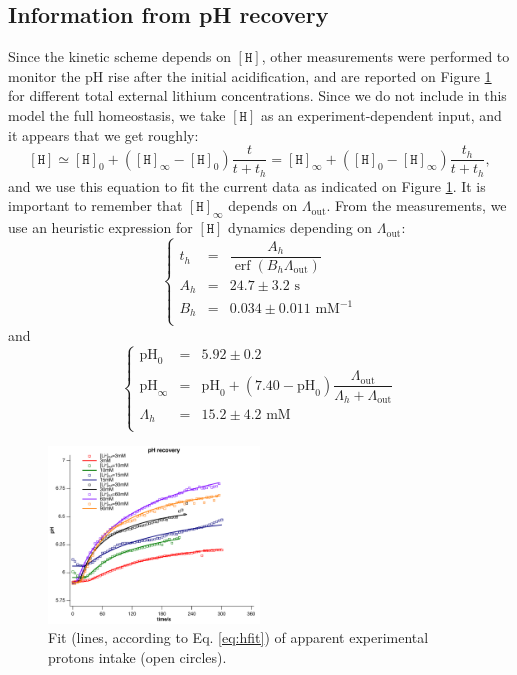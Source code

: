 \documentclass[aps,onecolumn,12pt]{revtex4}
\newcommand{\mychem}[1]{\mathtt{#1}}
\newcommand{\myconc}[1]{\left\lbrack{#1}\right\rbrack}
\newcommand{\spproton}{\mychem{H}}
\newcommand{\proton}{\myconc{\spproton}}
\newcommand{\LiAll}{\Lambda}
\newcommand{\LiAllOut}{{\LiAll}_{\mathrm{out}}}
\DeclareMathOperator\erf{erf}
\newcommand{\pH}{\ensuremath{\mathrm{pH}}}
\begin{document}
\subsection{Information from pH recovery}
Since the kinetic scheme depends on $\proton$, other measurements were performed to monitor the pH rise after the initial acidification, 
and are reported on Figure \ref{fig:protons} for different total external lithium concentrations. Since we do not include in this model the full homeostasis,
we take $\proton$ as an experiment-dependent input, and it appears that we get roughly:
\begin{equation}
\label{eq:hfit}
	\proton \simeq \proton_0 + \left(\proton_\infty-\proton_0\right) \dfrac{t}{t+t_h} = \proton_\infty + \left(\proton_0 - \proton_\infty\right) \dfrac{t_h}{t+t_h},
\end{equation}
and we use this equation to fit the current data as indicated on Figure \ref{fig:protons}. It is important to remember that $\proton_\infty$ depends on $\LiAllOut$.
From the measurements, we use an heuristic expression for $\proton$ dynamics depending on $\LiAllOut$:
\begin{equation}
\left\lbrace
\begin{array}{rcl}
t_h & = & \dfrac{A_h}{\erf\left(B_h\LiAllOut\right)}\\
A_h & = & 24.7      \pm 3.2 \text{ s}\\
B_h & = & 0.034     \pm 0.011\text{ mM}^{-1}\\ 
\end{array}
\right.
\end{equation}
and
\begin{equation}
\left\lbrace
\begin{array}{rcl}
\pH_0      & = & 5.92 \pm 0.2 \\
\pH_\infty & = & \pH_0 + \left(7.40-\pH_0\right) \dfrac{\LiAllOut}{\LiAll_h+\LiAllOut}\\
\LiAll_h   & = & 15.2\pm4.2\text{ mM}\\
\end{array}
\right.
\end{equation}


\begin{figure}[!ht]
\begin{center}
\includegraphics[width=0.5\textwidth]{protons.pdf}
\end{center}
\caption{\label{fig:protons} Fit (lines, according to Eq. \eqref{eq:hfit}) of apparent experimental protons intake (open circles).}
\end{figure}
\end{document}

